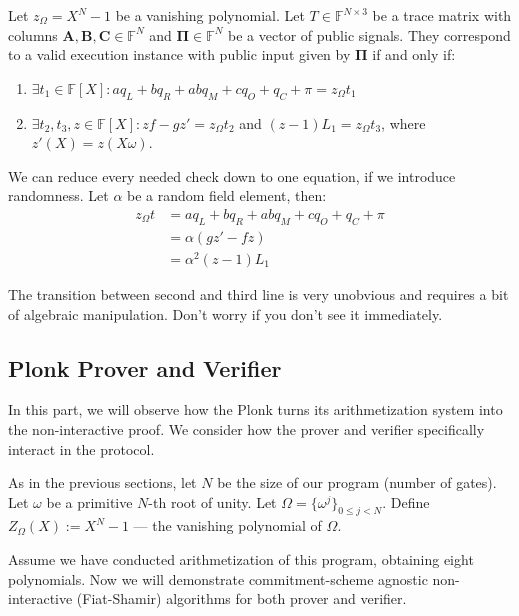 \documentclass[../lecture-notes.tex]{subfiles}
\begin{document}
\begin{definition}
Let $z_{\Omega} = X^N - 1$ be a vanishing polynomial. Let $T \in \mathbb{F}^{N
\times 3}$ be a trace matrix with columns $\mathbf{A}, \mathbf{B}, \mathbf{C}
\in \mathbb{F}^N$ and $\boldsymbol{\Pi} \in \mathbb{F}^N$ be a vector of public
signals. They correspond to a valid execution instance with public input given
by $\boldsymbol{\Pi}$ if and only if:

\begin{enumerate}
    \item \(\exists t_1 \in \mathbb{F}[X]: aq_L + bq_R + abq_M + cq_O + q_C + \pi = z_{\Omega}t_1\)
    \item \(\exists t_2, t_3, z \in \mathbb{F}[X]: zf - gz' = z_{\Omega}t_2\) and \((z-1)L_1 = z_{\Omega}t_3\), where $z'(X) = z(X\omega)$.
\end{enumerate}
\end{definition}
\begin{remark}
We can reduce every needed check down to one equation, if we introduce randomness.
Let $\alpha$ be a random field element, then: 
\[
    \begin{aligned}
        z_{\Omega}t &= aq_L + bq_R + abq_M + cq_O + q_C + \pi \\
        &= \alpha(gz' - fz) \\
        &= \alpha^2(z - 1)L_1
    \end{aligned}
\]

The transition between second and third line is very unobvious and requires a 
bit of algebraic manipulation. Don't worry if you don't see it immediately.
\end{remark}


\subsection{Plonk Prover and Verifier}

In this part, we will observe how the Plonk turns its arithmetization system
into the non-interactive proof. We consider how the prover and verifier specifically interact
in the protocol.

As in the previous sections, let $N$ be the size of our program (number of
gates). Let $\omega$ be a primitive $N$-th root of unity. Let $\Omega =
\{\omega^j\}_{0 \leq j < N}$. Define $Z_{\Omega}(X) := X^N - 1$ --- the vanishing 
polynomial of $\Omega$.

Assume we have conducted arithmetization of this program, obtaining eight
polynomials. Now we will demonstrate commitment-scheme agnostic non-interactive
(Fiat-Shamir) algorithms for both prover and verifier.
\end{document}
